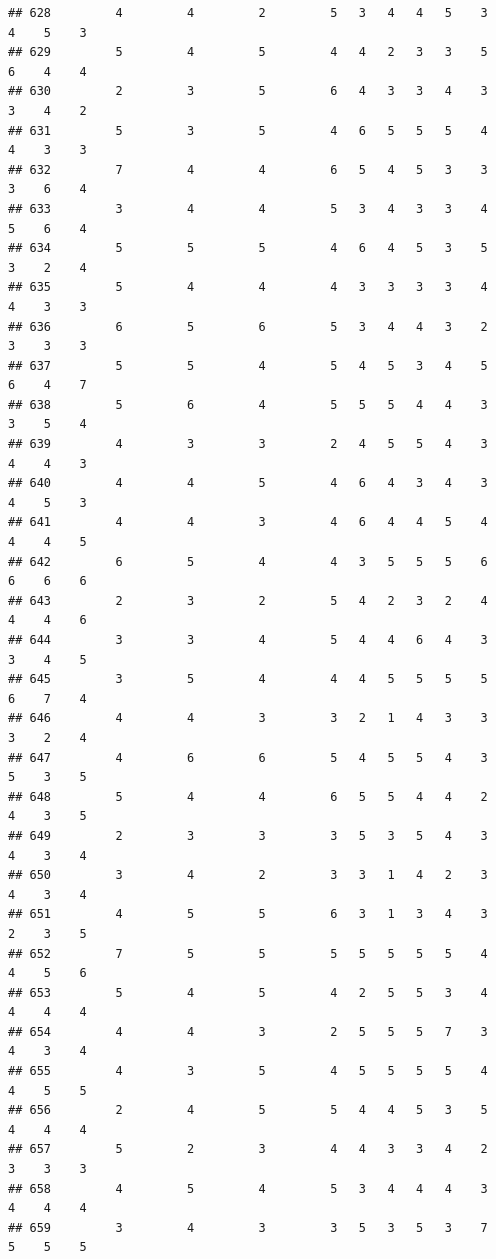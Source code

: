 \documentclass[
]{article}
\begin{document}
\begin{verbatim}
## 628         4         4         2         5   3   4   4   5    3    4    5    3
## 629         5         4         5         4   4   2   3   3    5    6    4    4
## 630         2         3         5         6   4   3   3   4    3    3    4    2
## 631         5         3         5         4   6   5   5   5    4    4    3    3
## 632         7         4         4         6   5   4   5   3    3    3    6    4
## 633         3         4         4         5   3   4   3   3    4    5    6    4
## 634         5         5         5         4   6   4   5   3    5    3    2    4
## 635         5         4         4         4   3   3   3   3    4    4    3    3
## 636         6         5         6         5   3   4   4   3    2    3    3    3
## 637         5         5         4         5   4   5   3   4    5    6    4    7
## 638         5         6         4         5   5   5   4   4    3    3    5    4
## 639         4         3         3         2   4   5   5   4    3    4    4    3
## 640         4         4         5         4   6   4   3   4    3    4    5    3
## 641         4         4         3         4   6   4   4   5    4    4    4    5
## 642         6         5         4         4   3   5   5   5    6    6    6    6
## 643         2         3         2         5   4   2   3   2    4    4    4    6
## 644         3         3         4         5   4   4   6   4    3    3    4    5
## 645         3         5         4         4   4   5   5   5    5    6    7    4
## 646         4         4         3         3   2   1   4   3    3    3    2    4
## 647         4         6         6         5   4   5   5   4    3    5    3    5
## 648         5         4         4         6   5   5   4   4    2    4    3    5
## 649         2         3         3         3   5   3   5   4    3    4    3    4
## 650         3         4         2         3   3   1   4   2    3    4    3    4
## 651         4         5         5         6   3   1   3   4    3    2    3    5
## 652         7         5         5         5   5   5   5   5    4    4    5    6
## 653         5         4         5         4   2   5   5   3    4    4    4    4
## 654         4         4         3         2   5   5   5   7    3    4    3    4
## 655         4         3         5         4   5   5   5   5    4    4    5    5
## 656         2         4         5         5   4   4   5   3    5    4    4    4
## 657         5         2         3         4   4   3   3   4    2    3    3    3
## 658         4         5         4         5   3   4   4   4    3    4    4    4
## 659         3         4         3         3   5   3   5   3    7    5    5    5

\end{verbatim}
\end{document}
